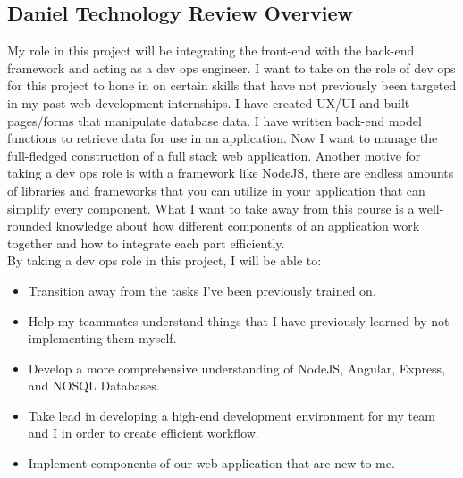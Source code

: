 \subsection{Daniel Technology Review Overview}
My role in this project will be integrating the front-end with the back-end framework and acting as a dev ops engineer. I want to take on the role of dev ops for this project to hone in on certain skills that have not previously been targeted in my past web-development internships. I have created UX/UI and built pages/forms that  manipulate database data. I have written back-end model functions to retrieve data for use in an application. Now I want to manage the full-fledged construction of a full stack web application. Another motive for taking a dev ops role is with a framework like NodeJS, there are endless amounts of libraries and frameworks that you can utilize in your application that can simplify every component. What I want to take away from this course is a well-rounded knowledge about how different components of an application work together and how to integrate each part efficiently.\\
By taking a dev ops role in this project, I will be able to:
\begin{itemize}
    \item Transition away from the tasks I've been previously trained on.
    \item Help my teammates understand things that I have previously learned by not implementing them myself.
    \item Develop a more comprehensive understanding of NodeJS, Angular, Express, and NOSQL Databases.
    \item Take lead in developing a high-end development environment for my team and I in order to create efficient workflow.
    \item Implement components of our web application that are new to me.
\end{itemize}

